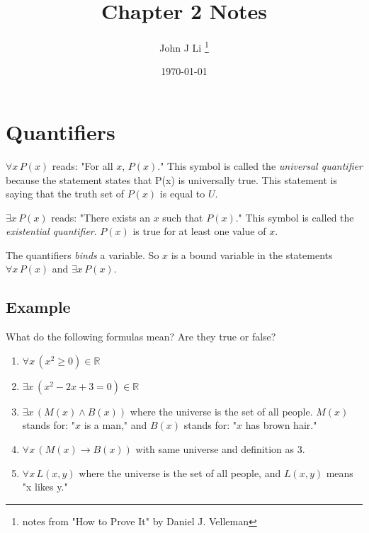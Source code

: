 \documentclass[12pt, letterpaper]{article}
\title{Chapter 2 Notes}
\author{John J Li \thanks{notes from "How to Prove It" by Daniel J. Velleman}}
\date{\today}
\begin{document}

    \begin{titlepage}
        \maketitle
    \end{titlepage}


    \tableofcontents{}

    \newpage

    \section{Quantifiers}

    $\forall x \, P(x)$ reads: "For all $x$, $P(x)$." This symbol is called the \emph{universal quantifier}
    because the statement states that P(x) is universally true. This statement is saying that the
    truth set of $P(x)$ is equal to $U$.

    $\exists x \, P(x)$ reads: "There exists an $x$ such that $P(x)$." This symbol is called the
    \emph{existential quantifier}. $P(x)$ is true for at least one value of $x$.

    The quantifiers \emph{binds} a variable. So $x$ is a bound variable in the statements
    $\forall x \, P(x)$ and $\exists x \, P(x)$.

    \subsection{Example}

    What do the following formulas mean? Are they true or false?

    \begin{enumerate}
        \item $\forall x \, (x^2 \geq 0) \in \mathbb{R}$
        \item $\exists x \, (x^2 - 2x + 3 = 0) \in \mathbb{R}$
        \item $\exists x \, (M(x) \land B(x))$ where the universe is the set of all people.
            $M(x)$ stands for: "$x$ is a man," and $B(x)$ stands for: "$x$ has brown hair."
        \item $\forall x \, (M(x) \rightarrow B(x))$ with same universe and definition as $3.$
        \item $\forall x \, L(x,y)$ where the universe is the set of all people,
            and $L(x,y)$ means "x likes y."
    \end{enumerate}
\end{document}
